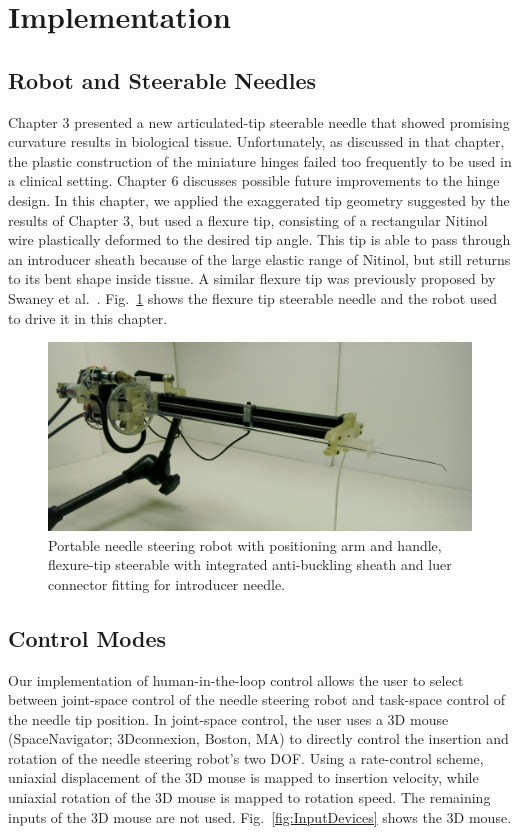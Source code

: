 \section{Implementation}
\label{sec:HumanInTheLoopImplementation}

\subsection{Robot and Steerable Needles}
\label{sec:NS2RobotAndNeedle}
Chapter 3 presented a new articulated-tip steerable needle that showed promising curvature results in biological tissue. Unfortunately, as discussed in that chapter, the plastic construction of the miniature hinges failed too frequently to be used in a clinical setting. Chapter 6 discusses possible future improvements to the hinge design. In this chapter, we applied the exaggerated tip geometry suggested by the results of Chapter 3, but used a flexure tip, consisting of a rectangular Nitinol wire plastically deformed to the desired tip angle. This tip is able to pass through an introducer sheath because of the large elastic range of Nitinol, but still returns to its bent shape inside tissue. A similar flexure tip was previously proposed by Swaney et al.~\cite{Swaney2013}. Fig.~\ref{fig:NS2AndNeedle} shows the flexure tip steerable needle and the robot used to drive it in this chapter.

\begin{figure}[!ht]
\centering
\includegraphics[width = \columnwidth]{./Images/Chapter5/NS2RobotAndNeedle/NS2RobotAndNeedle.jpg}%
\caption[Robot and flexure-tip steerable needles]{Portable needle steering robot with positioning arm and handle, flexure-tip steerable with integrated anti-buckling sheath and luer connector fitting for introducer needle.}
\label{fig:NS2AndNeedle}
\end{figure}  

\subsection{Control Modes}
Our implementation of human-in-the-loop control allows the user to select between joint-space control of the needle steering robot and task-space control of the needle tip position. In joint-space control, the user uses a 3D mouse (SpaceNavigator; 3Dconnexion, Boston, MA) to directly control the insertion and rotation of the needle steering robot's two DOF. Using a rate-control scheme, uniaxial displacement of the 3D mouse is mapped to insertion velocity, while uniaxial rotation of the 3D mouse is mapped to rotation speed. The remaining inputs of the 3D mouse are not used. Fig.~\ref{fig:InputDevices} shows the 3D mouse.

